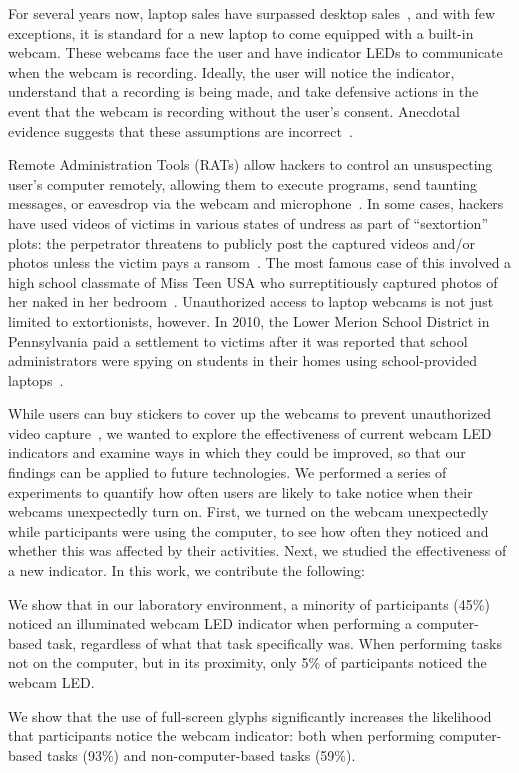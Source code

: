 \documentclass{sigchi}
\newenvironment{packed_item}{
\begin{itemize}
  \setlength{\itemsep}{1pt}
  \setlength{\parskip}{0pt}
  \setlength{\parsep}{0pt}
}{\end{itemize}}
\begin{document}
For several years now, laptop sales have surpassed desktop sales~\cite{Eddy2008}, and with few exceptions, it is standard for a new laptop to come equipped with a built-in webcam.  These webcams face the user and have indicator LEDs to communicate when the webcam is recording. Ideally, the user will notice the indicator, understand that a recording is being made, and take defensive actions in the event that the webcam is recording without the user's consent. Anecdotal evidence suggests that these assumptions are incorrect~\cite{Checkpoint2013}.

Remote Administration Tools (RATs) allow hackers to control an unsuspecting user's computer remotely, allowing them to execute programs, send taunting messages, or eavesdrop via the webcam and microphone~\cite{Anderson2013}.  In some cases, hackers have used videos of victims in various states of undress as part of ``sextortion'' plots: the perpetrator threatens to publicly post the captured videos and/or photos unless the victim pays a ransom~\cite{Anderson2011}. The most famous case of this involved a high school classmate of Miss Teen USA who surreptitiously captured photos of her naked in her bedroom~\cite{Dobuzinskis2013}.  Unauthorized access to laptop webcams is not just limited to extortionists, however.  In 2010, the Lower Merion School District in Pennsylvania paid a settlement to victims after it was reported that school administrators were spying on students in their homes using school-provided laptops~\cite{Hill2010}.
 
While users can buy stickers to cover up the webcams to prevent unauthorized video capture~\cite{EFFSticker}, we wanted to explore the effectiveness of current webcam LED indicators and examine ways in which they could be improved, so that our findings can be applied to future technologies.  We performed a series of experiments to quantify how often users are likely to take notice when their webcams unexpectedly turn on.  First, we turned on the webcam unexpectedly while participants were using the computer, to see how often they noticed and whether this was affected by their activities.  Next, we studied the effectiveness of a new indicator.  In this work, we contribute the following:

\begin{packed_item}
\item We show that in our laboratory environment, a minority of participants (45\%) noticed an illuminated webcam LED indicator when performing a computer-based task, regardless of what that task specifically was.  When performing tasks not on the computer, but in its proximity, only 5\% of participants noticed the webcam LED.
\item We show that the use of full-screen glyphs significantly increases the likelihood that participants notice the webcam indicator: both when performing computer-based tasks (93\%) and non-computer-based tasks (59\%).
\end{packed_item}
\end{document}
